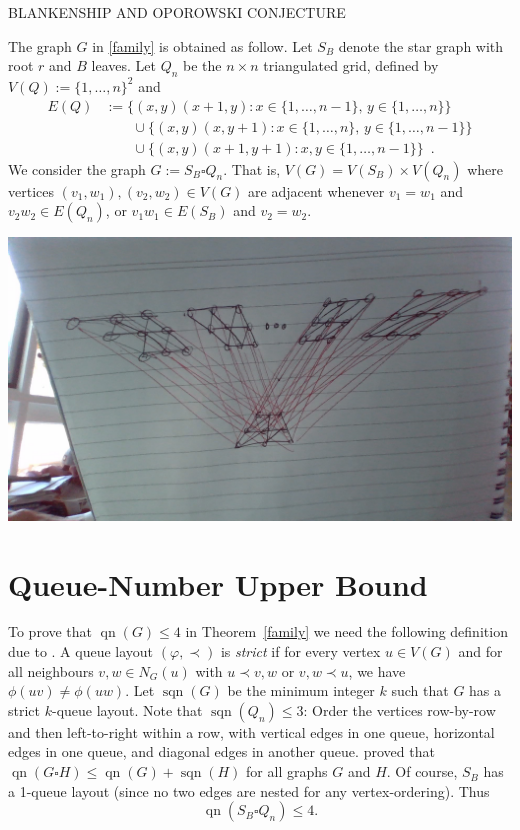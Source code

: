 \documentclass[kpfonts]{patmorin}
\DeclareMathOperator{\qn}{qn}
\DeclareMathOperator{\sqn}{sqn}
\renewcommand{\leq}{\leqslant}
\begin{document}
BLANKENSHIP AND OPOROWSKI CONJECTURE \citep{BO99,BO01}



The graph $G$ in \cref{family} is obtained as follow. Let $S_B$ denote the star graph with root $r$ and $B$ leaves.  Let $Q_n$ be the $n\times n$ triangulated grid, defined by $V(Q):=\{1,\ldots,n\}^2$ and
\begin{align*}
E(Q) & :=\{(x,y)(x+1,y):x\in\{1,\ldots,n-1\},\,y\in\{1,\ldots,n\}\} \\
& \qquad \cup \{(x,y)(x,y+1):x\in\{1,\ldots,n\},\,y\in\{1,\ldots,n-1\}\} \\
& \qquad \cup \{(x,y)(x+1,y+1):x,y\in\{1,\ldots,n-1\}\} \enspace .
\end{align*}
We consider the graph $G:=S_B\square Q_n$. That is, $V(G)=V(S_B)\times V(Q_n)$ where vertices $(v_1,w_1),(v_2,w_2)\in V(G)$ are adjacent whenever $v_1=w_1$ and $v_2w_2\in E(Q_n)$, or $v_1w_1\in E(S_B)$ and $v_2=w_2$. 

\includegraphics[width=\textwidth]{figs/figure}


\section{Queue-Number Upper Bound}

To prove that $\qn(G)\leq 4$ in Theorem~\ref{family} we need the following definition due to \citet{Wood-Queue-DMTCS05}. A queue layout $(\varphi,\prec)$ is \emph{strict} if for every vertex $u\in V(G)$ and for all neighbours $v,w\in N_G(u)$ with $u\prec v,w$ or $v,w \prec u$, we have $\phi(uv)\neq \phi(uw)$. Let $\sqn(G)$ be the minimum integer $k$ such that $G$ has a strict $k$-queue layout. 
Note that $\sqn(Q_n) \leq 3$: Order the vertices row-by-row and then left-to-right within a row, with vertical edges in one queue, horizontal edges in one queue, and diagonal edges in another queue. 
\citet{Wood-Queue-DMTCS05} proved that $\qn(G \square H) \leq \qn(G) + \sqn(H)$ for all graphs $G$ and $H$. Of course, $S_B$ has a 1-queue layout (since no two edges are nested for any vertex-ordering). Thus 
$$\qn(S_B \square Q_n)\leq 4.$$
\end{document}
